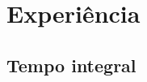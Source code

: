 \documentclass[a4paper]{cv-friggeri-x}
\begin{document}




\section{Experiência}

\subsection{Tempo integral}
\end{document}
